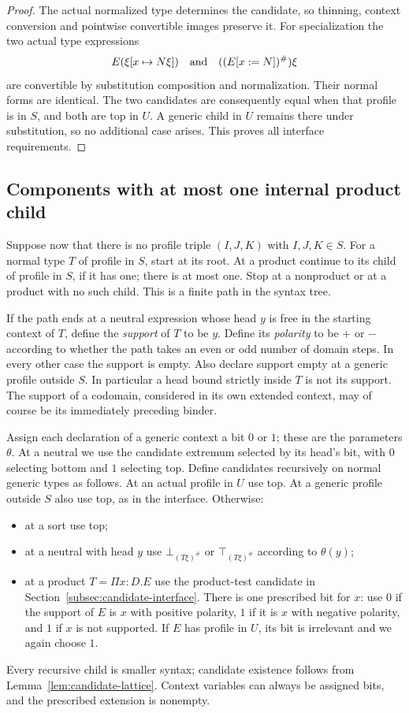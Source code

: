 \begin{proof}
The actual normalized type determines the candidate, so thinning,
context conversion and pointwise convertible images preserve it.
For specialization the two actual type expressions
\[
 E(\xi[x\mapsto N\xi])
       \quad\hbox{and}\quad ((E[x:=N])^\#)\xi
\]
are convertible by substitution composition and normalization.
Their normal forms are identical. The two candidates are consequently
equal when that profile is in $S$, and both are top in $U$. A generic
child in $U$ remains there under substitution, so no additional case
arises. This proves all interface requirements.
\end{proof}

\subsection{Components with at most one internal product child}

Suppose now that there is no profile triple $(I,J,K)$ with
$I,J,K\in S$. For a normal type $T$ of profile in $S$, start at its
root. At a product continue to its child of profile in $S$, if it has
one; there is at most one. Stop at a nonproduct or at a product with
no such child. This is a finite path in the syntax tree.

If the path ends at a neutral expression whose head $y$ is free in
the starting context of $T$, define the \emph{support} of $T$ to be
$y$. Define its \emph{polarity} to be $+$ or $-$ according to whether
the path takes an even or odd number of domain steps. In every other
case the support is empty. Also declare support empty at a generic
profile outside $S$. In particular a head bound strictly inside
$T$ is not its support. The support of a codomain, considered in its
own extended context, may of course be its immediately preceding
binder.

Assign each declaration of a generic context a bit $0$ or $1$;
these are the parameters $\theta$. At a neutral we use the candidate
extremum selected by its head's bit, with $0$ selecting bottom and $1$
selecting top. Define candidates recursively on normal generic types
as follows. At an actual profile in $U$ use top. At a generic profile
outside $S$ also use top, as in the interface. Otherwise:
\begin{itemize}
\item at a sort use top;
\item at a neutral with head $y$ use
      $\bot_{(T\xi)^\#}$ or $\top_{(T\xi)^\#}$ according to
      $\theta(y)$;
\item at a product $T=\Pi x:D.E$ use the product-test candidate
      in Section~\ref{subsec:candidate-interface}. There is one prescribed
      bit for $x$: use $0$ if the support of $E$ is $x$ with positive
      polarity, $1$ if it is $x$ with negative polarity, and $1$ if
      $x$ is not supported. If $E$ has profile in $U$, its bit is
      irrelevant and we again choose $1$.
\end{itemize}
Every recursive child is smaller syntax; candidate existence follows
from Lemma~\ref{lem:candidate-lattice}. Context variables can always
be assigned bits, and the prescribed extension is nonempty.

